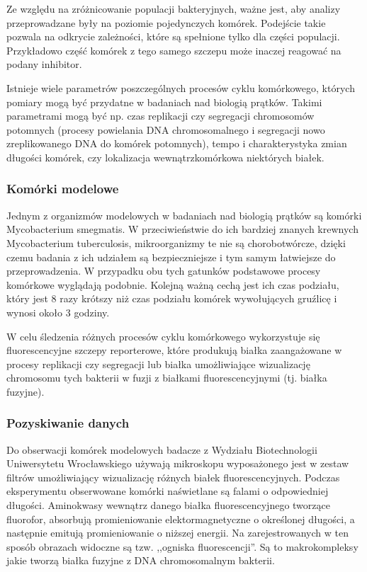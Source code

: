 \documentclass[declaration,shortabstract,mgr]{iithesis}
\begin{document}
Ze względu na zróżnicowanie populacji bakteryjnych, ważne jest, aby analizy przeprowadzane były na poziomie pojedynczych komórek.
Podejście takie pozwala na odkrycie zależności, które są spełnione tylko dla części populacji.
Przykładowo część komórek z tego samego szczepu może inaczej reagować na podany inhibitor.

Istnieje wiele parametrów poszczególnych procesów cyklu komórkowego, których pomiary mogą być przydatne w badaniach nad biologią prątków.
Takimi parametrami mogą być np. czas replikacji czy segregacji chromosomów potomnych (procesy powielania DNA chromosomalnego i segregacji nowo zreplikowanego DNA do komórek potomnych), tempo i charakterystyka zmian długości komórek, czy lokalizacja wewnątrzkomórkowa niektórych białek.

\subsubsection{Komórki modelowe}

Jednym z organizmów modelowych w badaniach nad biologią prątków są komórki Mycobacterium smegmatis.
W przeciwieństwie do ich bardziej znanych krewnych Mycobacterium tuberculosis, mikroorganizmy te nie są chorobotwórcze, dzięki czemu badania z ich udziałem są bezpieczniejsze i tym samym łatwiejsze do przeprowadzenia.
W przypadku obu tych gatunków podstawowe procesy komórkowe wyglądają podobnie.
Kolejną ważną cechą jest ich czas podziału, który jest 8 razy krótszy niż czas podziału komórek wywołujących gruźlicę i wynosi około 3 godziny.

W celu śledzenia różnych procesów cyklu komórkowego wykorzystuje się fluorescencyjne szczepy reporterowe, które produkują białka zaangażowane w procesy replikacji czy segregacji lub białka umożliwiające wizualizację chromosomu tych bakterii w fuzji z białkami fluorescencyjnymi (tj. białka fuzyjne).

\subsubsection{Pozyskiwanie danych}

Do obserwacji komórek modelowych badacze z Wydziału Biotechnologii Uniwersytetu Wrocławskiego używają mikroskopu wyposażonego jest w zestaw filtrów umożliwiający wizualizację różnych białek fluorescencyjnych.
Podczas eksperymentu obserwowane komórki naświetlane są falami o odpowiedniej długości.
Aminokwasy wewnątrz danego białka fluorescencyjnego tworzące fluorofor, absorbują promieniowanie elektormagnetyczne o określonej długości, a następnie emitują promieniowanie o niższej energii.
Na zarejestrowanych w ten sposób obrazach widoczne są tzw. ,,ogniska fluorescencji''.
Są to makrokompleksy jakie tworzą białka fuzyjne z DNA chromosomalnym bakterii. 
\end{document}
